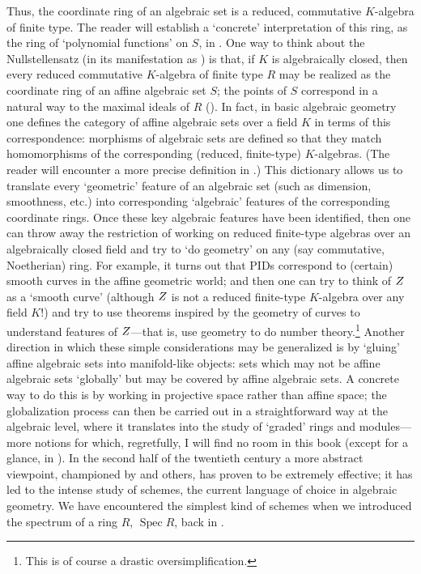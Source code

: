 Thus, the coordinate ring of an algebraic set is a reduced,
commutative $K$-algebra of finite type. The reader will establish a
`concrete' interpretation of this ring, as the ring of `polynomial
functions' on $S$, in
. One way to think
about the Nullstellensatz (in its manifestation as
) is that, if $K$ is algebraically closed, then
every reduced commutative $K$-algebra of finite type $R$ may be
realized as the coordinate ring of an affine algebraic set $S$; the
points of $S$ correspond in a natural way to the maximal ideals of $R$
().  In fact, in
basic algebraic geometry one defines the category of affine algebraic
sets over a field $K$ in terms of this correspondence: morphisms of
algebraic sets are defined so that they match homomorphisms of the
corresponding (reduced, finite-type) $K$-algebras. (The reader will
encounter a more precise definition in .)  This
dictionary allows us to translate every `geometric' feature of an
algebraic set (such as dimension, smoothness, etc.) into corresponding
`algebraic' features of the corresponding coordinate rings. Once these
key algebraic features have been identified, then one can throw away
the restriction of working on reduced finite-type algebras over an
algebraically closed field and try to `do geometry' on any (say
commutative, Noetherian) ring. For example, it turns out that PIDs
correspond to (certain) smooth curves in the affine geometric world;
and then one can try to think of $Z$ as a `smooth curve' (although
$Z$ is not a reduced finite-type $K$-algebra over any field $K$!) and
try to use theorems inspired by the geometry of curves to understand
features of $Z$---that is, use geometry to do number
theory.\footnote{This is of course a drastic oversimplification.}
Another direction in which these simple considerations may be
generalized is by `gluing' affine algebraic sets into manifold-like
objects: sets which may not be affine algebraic sets `globally' but
may be covered by affine algebraic sets. A concrete way to do this is
by working in projective space rather than affine space; the
globalization process can then be carried out in a straightforward way
at the algebraic level, where it translates into the study of `graded'
rings and modules---more notions for which, regretfully, I will find
no room in this book (except for a glance, in
). In the
second half of the twentieth century a more abstract viewpoint,
championed by  and others, has proven to
be extremely effective; it has led to the intense study of schemes,
the current language of choice in algebraic geometry. We have
encountered the simplest kind of schemes when we introduced the
spectrum of a ring $R$, $\operatorname{Spec} R$, back in
.

